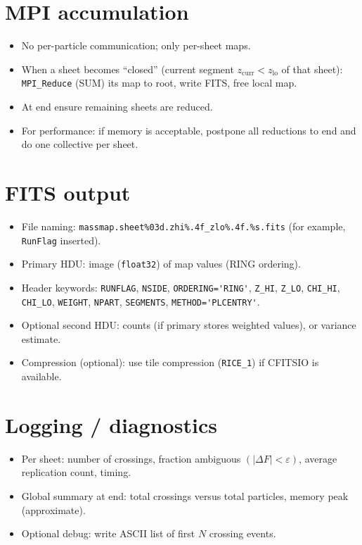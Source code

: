 \documentclass[11pt]{article}
\begin{document}
\section{MPI accumulation}
\begin{itemize}
  \item No per-particle communication; only per-sheet maps.
  \item When a sheet becomes ``closed'' (current segment \(z_{\mathrm{curr}} < z_{\mathrm{lo}}\) of that sheet): \verb|MPI_Reduce| (SUM) its map to root, write FITS, free local map.
  \item At end ensure remaining sheets are reduced.
  \item For performance: if memory is acceptable, postpone all reductions to end and do one collective per sheet.
\end{itemize}

\section{FITS output}
\begin{itemize}
  \item File naming: \verb|massmap.sheet%03d.zhi%.4f_zlo%.4f.%s.fits| (for example, \texttt{RunFlag} inserted).
  \item Primary HDU: image (\verb|float32|) of map values (RING ordering).
  \item Header keywords: \verb|RUNFLAG|, \verb|NSIDE|, \verb|ORDERING='RING'|, \verb|Z_HI|, \verb|Z_LO|, \verb|CHI_HI|, \verb|CHI_LO|, \verb|WEIGHT|, \verb|NPART|, \verb|SEGMENTS|, \verb|METHOD='PLCENTRY'|.
  \item Optional second HDU: counts (if primary stores weighted values), or variance estimate.
  \item Compression (optional): use tile compression (\verb|RICE_1|) if CFITSIO is available.
\end{itemize}

\section{Logging / diagnostics}
\begin{itemize}
  \item Per sheet: number of crossings, fraction ambiguous \((\lvert \Delta F\rvert < \varepsilon)\), average replication count, timing.
  \item Global summary at end: total crossings versus total particles, memory peak (approximate).
  \item Optional debug: write ASCII list of first \(N\) crossing events.
\end{itemize}
\end{document}
